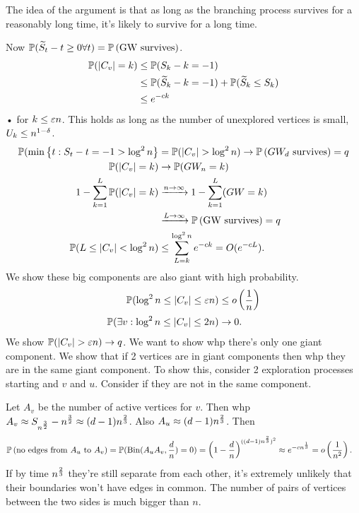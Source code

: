 The idea of the argument is that as long as the branching process survives for a reasonably long time, it's likely to survive for a long time.

Now $\mathbb{P}(\widetilde{S}_t - t\ge 0\forall t) = \mathbb{P}\left( \text{GW survives} \right)$. 
\begin{align}
\mathbb{P}(|C_v|=k)
&\le \mathbb{P}(S_k-k=-1)\\
&\le \mathbb{P}(\widetilde{S}_k - k =-1) + \mathbb{P}(\widetilde{S}_k\le S_k)\\
&\le e^{-ck}
\end{align}•
for $k\le \varepsilon n$. This holds as long as the number of unexplored vertices is small, $U_k\le n^{1-\delta}$.
\begin{align}
\Pj(\min\set{t}{S_t-t=-1>\log^2 n} &=\Pj(|C_v|>\log^2n) \to \Pj\pat{$GW_d$  survives}=q\\
\Pj(|C_v|=k) &\to \Pj(GW_n=k)\\
1-\sumo kL \Pj(|C_v|=k)&\xra{n\to \iy} 1-\sumo kL (GW=k)\\
&\xra{L\to \iy} \Pj\pat{GW survives}=q\\
\Pj(L\le |C_v|<\log^2n) &\le \sum_{L=k}^{\log^2 n}e^{-ck} = O(e^{-cL}).
\end{align}
We show these big components are also giant with high probability.
\begin{align}
\mathbb{P}(\log^2 n \le |C_v| \le \varepsilon n)
&\le o\left( {\frac{1}{n}} \right)\\
\mathbb{P}(\exists v: \log^2 n\le |C_v|\le 2n)&\to 0.
\end{align}
We show $\Pj(|C_v|>\ep n)\to q$. 
We want to show whp there's only one giant component. We show that if 2 vertices are in giant components then whp they are in the same giant component. To show this, consider 2 exploration processes starting and $v$ and $u$.
Consider if they are not in the same component.

Let $A_v$ be the number of active vertices for $v$. Then whp $A_v\approx S_{n^{\frac{3}{2}}}-n^{\frac{3}{2}} \approx (d-1)n^{\frac{2}{3}}$.
Also $A_u\approx (d-1)n^{\frac{2}{3}}$. Then
\begin{align}
\mathbb{P}\left( \text{no edges from $A_u$ to $A_v$} \right)
&= \mathbb{P}(\text{Bin}(A_uA_v, \frac{d}{n})=0)
=\left( {1-\frac{d}{n}} \right)^{((d-1)n^{\frac{2}{3}})^2}\approx e^{-cn^{\frac{1}{3}}}= o\left( {\frac{1}{n^2}} \right).
\end{align}
If by time $n^{\frac{2}{3}}$ they're still separate from each other, it's extremely unlikely that their boundaries won't have edges in common. The number of pairs of vertices between the two sides is much bigger than $n$.


